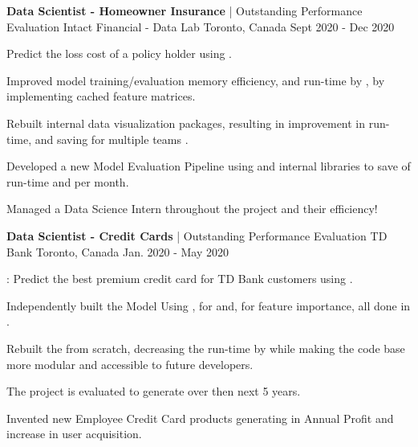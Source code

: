 
\begin{cventries}
  \cventry
    {\textbf{Data Scientist - Homeowner Insurance} | Outstanding Performance Evaluation} %
    {Intact Financial - Data Lab} %
    {Toronto, Canada} %
    {Sept 2020 - Dec 2020} %
    {
      \begin{cvitems} %
        \item { Predict the loss cost of a policy holder using .}
        \item {Improved model training/evaluation memory efficiency, and run-time by , by implementing cached feature matrices.}
        \item {Rebuilt internal data visualization packages, resulting in  improvement in run-time, and saving  for multiple teams .}
        \item {Developed a new Model Evaluation Pipeline using  and internal libraries to save  of run-time and  per month.}
        \item {Managed a Data Science Intern throughout the project and  their efficiency!}
      \end{cvitems}
    }

  \cventry
    {\textbf{Data Scientist - Credit Cards} | Outstanding Performance Evaluation} %
    {TD Bank} %
    {Toronto, Canada} %
    {Jan. 2020 - May 2020} %
    {
      \begin{cvitems} %
        \item {: Predict the best premium credit card for TD Bank customers using .}
        \item {Independently built the  Model Using ,  for  and,  for feature importance, all done in .}
        \item {Rebuilt the  from scratch, decreasing the run-time by  while making the code base more modular and accessible to future developers.}
        \item {The project is evaluated to generate  over then next 5 years.}
        \item {Invented new Employee Credit Card products generating  in Annual Profit and  increase in user acquisition.}
      \end{cvitems}
    }


\end{cventries}
